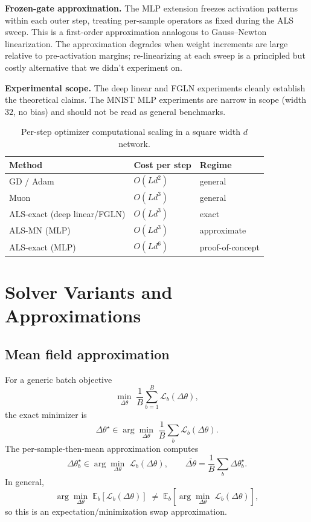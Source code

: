 \documentclass{article}
\begin{document}
\textbf{Frozen-gate approximation.}
The MLP extension freezes activation patterns within each outer step, treating
per-sample operators as fixed during the ALS sweep.
This is a first-order approximation analogous to Gauss--Newton linearization.
The approximation degrades when weight increments are large relative to
pre-activation margins; re-linearizing at each sweep is a principled but
costly alternative that we didn't experiment on.

\textbf{Experimental scope.}
The deep linear and FGLN experiments cleanly establish the theoretical claims.
The MNIST MLP experiments are narrow in scope (width $32$, no bias) and should not be read as general benchmarks.



\begin{table}[t]
\centering
\scriptsize
\caption{Per-step optimizer computational scaling in a square width $d$ network.}
\label{tab:cost}
\begin{tabular}{lll}
  \toprule
  Method                        & Cost per step  & Regime \\
  \midrule
  GD / Adam                     & $O(L d^2)$     & general \\
  Muon                          & $O(L d^3)$     & general \\
  ALS-exact (deep linear/FGLN)  & $O(L d^3)$     & exact \\
  ALS-MN (MLP)                  & $O(L d^3)$     & approximate \\
  ALS-exact (MLP)               & $O(L d^6)$     & proof-of-concept \\
  \bottomrule
\end{tabular}
\end{table}





\section{Solver Variants and Approximations}
\label{app:variants}

\subsection{Mean field approximation}
\label{app:mean-field}


For a generic batch objective
\[
\min_{\Delta \theta}\; \frac1B\sum_{b=1}^B \mathcal L_b(\Delta\theta),
\]
the exact minimizer is
\[
\Delta\theta^\star \in \arg\min_{\Delta\theta}\; \frac1B\sum_b \mathcal L_b(\Delta\theta).
\]
The per-sample-then-mean approximation computes
\[
\Delta\theta_b^\star \in \arg\min_{\Delta\theta}\; \mathcal L_b(\Delta\theta),
\qquad
\bar{\Delta\theta}=\frac1B\sum_b \Delta\theta_b^\star.
\]
In general,
\[
\arg\min_{\Delta\theta}\; \mathbb E_b[\mathcal L_b(\Delta\theta)]
\;\neq\;
\mathbb E_b\!\left[\arg\min_{\Delta\theta}\; \mathcal L_b(\Delta\theta)\right],
\]
so this is an expectation/minimization swap approximation.
\end{document}
